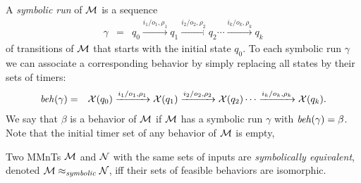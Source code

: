 A \emph{symbolic run} of ${\cal M}$ is a sequence
\begin{eqnarray*}
\gamma & = & q_0 \xrightarrow{i_1/o_1, \rho_1} q_1  \xrightarrow{i_2/o_2, \rho_2} q_2 \cdots \xrightarrow{i_k/o_k, \rho_k} q_k
\end{eqnarray*}
of transitions of ${\cal M}$ that starts with the initial state $q_0$. 
To each symbolic run $\gamma$ we can associate a corresponding behavior by simply replacing all
states by their sets of timers:
\begin{eqnarray*}
\mathit{beh}(\gamma) & = & \mathcal{X}(q_0) \xrightarrow{i_1/o_1, \rho_1} \mathcal{X}(q_1)  \xrightarrow{i_2/o_2, \rho_2} \mathcal{X}(q_2) \cdots \xrightarrow{i_k/o_k, \rho_k} \mathcal{X}(q_k).
\end{eqnarray*}
We say that $\beta$ is a behavior of ${\cal M}$ if ${\cal M}$ has a symbolic run $\gamma$ with $\mathit{beh}(\gamma) = \beta$.
Note that the initial timer set of any behavior of ${\cal M}$ is empty,

Two MMnTs ${\cal M}$ and ${\cal N}$ with the same sets of inputs are \emph{symbolically equivalent}, denoted ${\cal M} \approx_{\mathit{symbolic}} {\cal N}$, iff their sets of feasible behaviors are isomorphic.


